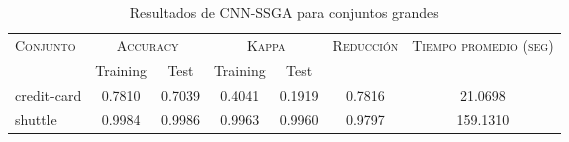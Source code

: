 \begin{table}[]
\centering
\begin{tabular}{l c c c c c c}
\hline
\multirow{2}{*}{\textsc{Conjunto}}
	& \multicolumn{2}{c}{\textsc{Accuracy}}
	& \multicolumn{2}{c}{\textsc{Kappa}}
	& \textsc{Reducción}
	& \textsc{Tiempo promedio (seg)} \\
	& Training & Test
	& Training & Test \\ 
\hline
\hline

credit-card & 0.7810 & 0.7039 & 0.4041 & 0.1919 & 0.7816 & 21.0698 \\
shuttle & 0.9984 & 0.9986 & 0.9963 & 0.9960 & 0.9797 & 159.1310 \\

\hline
\end{tabular}
\caption{Resultados de CNN-SSGA para conjuntos grandes }
\label{res-grande-cnn-ssga}
\end{table}

